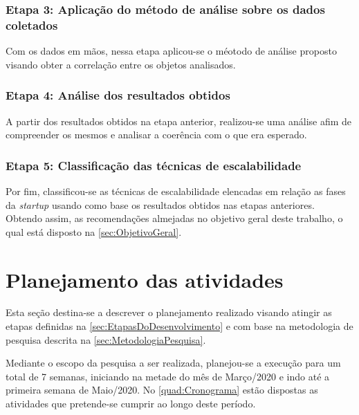 \subsubsection{Etapa 3: Aplicação do método de análise sobre os dados coletados}

Com os dados em mãos, nessa etapa aplicou-se o méotodo de análise proposto visando obter a
correlação entre os objetos analisados.

\subsubsection{Etapa 4: Análise dos resultados obtidos}

A partir dos resultados obtidos na etapa anterior, realizou-se uma análise afim de compreender os
mesmos e analisar a coerência com o que era esperado.

\subsubsection{Etapa 5: Classificação das técnicas de escalabilidade}

Por fim, classificou-se as técnicas de escalabilidade elencadas em relação as fases da
\textit{startup} usando como base os resultados obtidos nas etapas anteriores. Obtendo assim, as
recomendações almejadas no objetivo geral deste trabalho, o qual está disposto na \autoref{sec:ObjetivoGeral}.

\section{Planejamento das atividades}

Esta seção destina-se a descrever o planejamento realizado visando atingir as etapas definidas
na \autoref{sec:EtapasDoDesenvolvimento} e com base na metodologia de pesquisa descrita
na \autoref{sec:MetodologiaPesquisa}.

Mediante o escopo da pesquisa a ser realizada, planejou-se a execução para um total
de 7 semanas, iniciando na metade do mês de Março/2020 e indo até a primeira semana de
Maio/2020. No \autoref{quad:Cronograma} estão dispostas as atividades que pretende-se cumprir
ao longo deste período.

